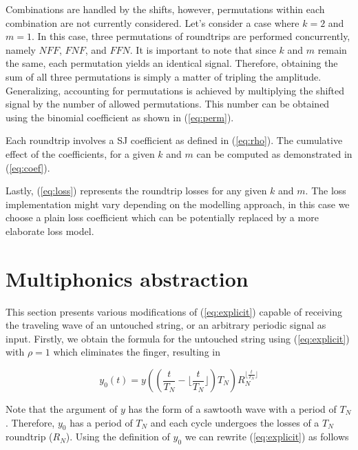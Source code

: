 \documentclass{sigchi}
\begin{document}
Combinations are handled by the shifts, however, permutations within each combination are not currently considered.
Let's consider a case where $k = 2$ and $m = 1$.
In this case, three permutations of roundtrips are performed concurrently, namely $NFF$, $FNF$, and $FFN$.
It is important to note that since $k$ and $m$ remain the same, each permutation yields an identical signal.
Therefore, obtaining the sum of all three permutations is simply a matter of tripling the amplitude.
Generalizing, accounting for permutations is achieved by multiplying the shifted signal by the number of allowed permutations.
This number can be obtained using the binomial coefficient as shown in (\ref{eq:perm}).

Each roundtrip involves a SJ coefficient as defined in (\ref{eq:rho}).
The cumulative effect of the coefficients, for a given $k$ and $m$ can be computed as demonstrated in (\ref{eq:coef}).

Lastly, (\ref{eq:loss}) represents the roundtrip losses for any given $k$ and $m$.
The loss implementation might vary depending on the modelling approach, in this case we choose a plain loss coefficient which can be potentially replaced by a more elaborate loss model.


\section{Multiphonics abstraction}

This section presents various modifications of (\ref{eq:explicit}) capable of receiving the traveling wave of an untouched string, or an arbitrary periodic signal as input.
Firstly, we obtain the formula for the untouched string using (\ref{eq:explicit}) with $\rho=1$ which eliminates the finger, resulting in

\begin{equation}
	y_0(t) = y((\frac{t}{T_N}-\lfloor\frac{t}{T_N}\rfloor)T_N)R_N^{\lfloor\frac{t}{T_N}\rfloor}
\end{equation}


Note that the argument of $y$ has the form of a sawtooth wave with a period of $T_N$. Therefore, $y_0$ has a period of $T_N$ and each cycle undergoes the losses of a $T_N$ roundtrip ($R_N$).
Using the definition of $y_0$ we can rewrite (\ref{eq:explicit}) as follows
\end{document}
